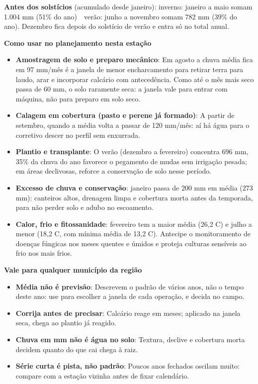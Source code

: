 \documentclass[10pt,a4paper]{article}
\begin{document}
\vspace{1pt}
{\footnotesize\textbf{Antes dos solstícios} (acumulado desde janeiro):
inverno: janeiro a maio somam 1.004 mm (51\% do ano) \,\textbullet\, verão: junho a novembro somam 782 mm (39\% do ano). Dezembro fica depois do solstício de verão e entra só no total
anual.}

\vspace{2pt}
{\bfseries\small Como usar no planejamento nesta estação}

\footnotesize\begin{itemize}\setlength{\itemsep}{0.5pt}
  \item \textbf{Amostragem de solo e preparo mecânico}: Em agosto a chuva média fica em 97 mm/mês \textemdash{} é a janela de menor encharcamento para retirar terra para laudo, arar e incorporar calcário com antecedência. Como até o mês mais seco passa de 60 mm, o solo raramente seca: a janela vale para entrar com máquina, não para preparo em solo seco.
  \item \textbf{Calagem em cobertura (pasto e perene já formado)}: A partir de setembro, quando a média volta a passar de 120 mm/mês: aí há água para o corretivo descer no perfil sem enxurrada.
  \item \textbf{Plantio e transplante}: O verão (dezembro a fevereiro) concentra 696 mm, 35\% da chuva do ano \textemdash{} favorece o pegamento de mudas sem irrigação pesada; em áreas declivosas, reforce a conservação de solo nesse período.
  \item \textbf{Excesso de chuva e conservação}: janeiro passa de 200 mm em média (273 mm): canteiros altos, drenagem limpa e cobertura morta antes da temporada, para não perder solo e adubo no escoamento.
  \item \textbf{Calor, frio e fitossanidade}: fevereiro tem a maior média (26,2 \textdegree{}C) e julho a menor (18,2 \textdegree{}C, com mínima média de 13,2 \textdegree{}C). Antecipe o monitoramento de doenças fúngicas nos meses quentes e úmidos e proteja culturas sensíveis ao frio nos mais frios.
\end{itemize}

\vspace{1pt}
{\bfseries\small Vale para qualquer município da região}

\scriptsize\begin{itemize}\setlength{\itemsep}{0.5pt}
  \item \textbf{Média não é previsão}: Descrevem o padrão de vários anos, não o tempo deste ano: use para escolher a janela de cada operação, e decida no campo.
  \item \textbf{Corrija antes de precisar}: Calcário reage em meses; aplicado na janela seca, chega ao plantio já reagido.
  \item \textbf{Chuva em mm não é água no solo}: Textura, declive e cobertura morta decidem quanto do que cai chega à raiz.
  \item \textbf{Série curta é pista, não padrão}: Poucos anos fechados oscilam muito: compare com a estação vizinha antes de fixar calendário.
\end{itemize}
\end{document}
